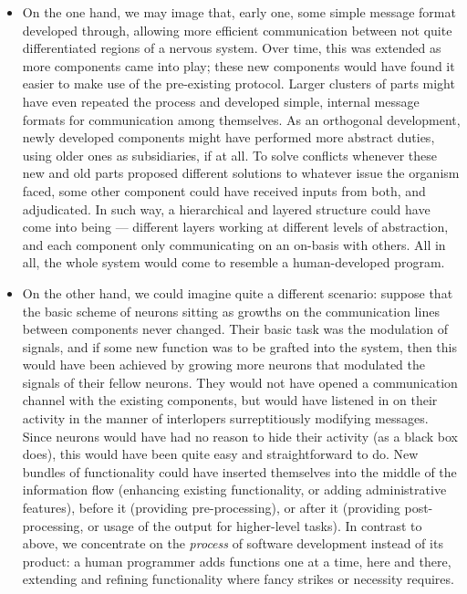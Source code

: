 \begin{itemize}
	\item On the one hand, we may image that, early one, some simple message format developed through, allowing more efficient communication between not quite differentiated regions of a nervous system. Over time, this was extended as more components came into play; these new components would have found it easier to make use of the pre-existing protocol. Larger clusters of parts might have even repeated the process and developed simple, internal message formats for communication among themselves. As an orthogonal development, newly developed components might have performed more abstract duties, using older ones as subsidiaries, if at all. To solve conflicts whenever these new and old parts proposed different solutions to whatever issue the organism faced, some other component could have received inputs from both, and adjudicated. In such way, a hierarchical and layered structure could have come into being --- different layers working at different levels of abstraction, and each component only communicating on an on-basis with others. All in all, the whole system would come to resemble a human-developed program.
	
	\item On the other hand, we could imagine quite a different scenario: suppose that the basic scheme of neurons sitting as growths on the communication lines between components never changed. Their basic task was the modulation of signals, and if some new function was to be grafted into the system, then this would have been achieved by growing more neurons that modulated the signals of their fellow neurons. They would not have opened a communication channel with the existing components, but would have listened in on their activity in the manner of interlopers surreptitiously modifying messages. Since neurons would have had no reason to hide their activity (as a black box does), this would have been quite easy and straightforward to do. New bundles of functionality could have inserted themselves into the middle of the information flow (enhancing existing functionality, or adding administrative features), before it (providing pre-processing), or after it (providing post-processing, or usage of the output for higher-level tasks). In contrast to above, we concentrate on the {\em process} of software development instead of its product: a human programmer adds functions one at a time, here and there, extending and refining functionality where fancy strikes or necessity requires.
\end{itemize}

